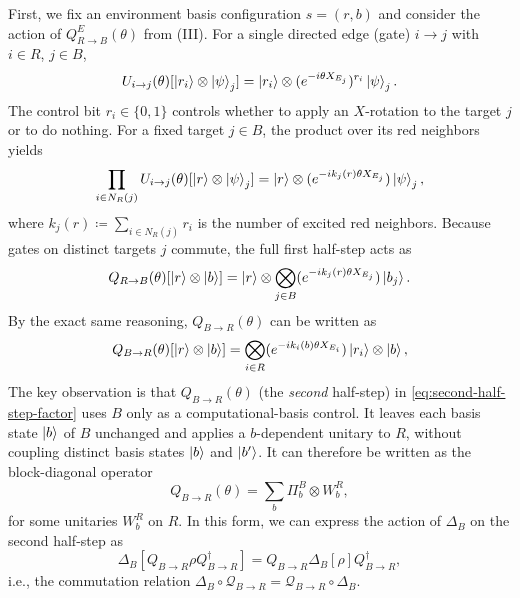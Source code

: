 \documentclass[
    aps,
    prx,
    reprint,
    superscriptaddress,
    longbibliography,
    nofootinbib,
    floatfix,
]{revtex4-2}
\begin{document}
First, we fix an environment basis configuration \(s = (r,b)\) and consider the action of \(Q_{R\to B}^E(\theta)\) from (III). For a single directed edge (gate) \(i \to j\) with \(i \in R\), \(j \in B\),
\begin{equation}\label{eq:single-i-single-j}
    U_{i\to j}(\theta)[\ket{r_i} \otimes \ket{\psi}_j] = \ket{r_i} \otimes (e^{-i\theta X_{E_j}})^{r_i} \ket{\psi}_j.
\end{equation}
The control bit \(r_i \in \{0,1\}\) controls whether to apply an \(X\)-rotation to the target \(j\) or to do nothing. For a fixed target \(j \in B\), the product over its red neighbors yields
\begin{equation}\label{eq:single-j}
    \prod_{i \in N_R(j)} U_{i\to j}(\theta)[\ket{r} \otimes \ket{\psi}_j] = \ket{r} \otimes (e^{-ik_j(r)\theta X_{E_j}}) \ket{\psi}_j,
\end{equation}
where \(k_j(r) \coloneq \sum_{i \in N_R(j)} r_i\) is the number of excited red neighbors. Because gates on distinct targets \(j\) commute, the full first half-step acts as
\begin{equation}\label{eq:first-half-step-factor}
    Q_{R\to B}(\theta)[\ket{r} \otimes \ket{b}] = \ket{r} \otimes \bigotimes_{j \in B} (e^{-ik_j(r)\theta X_{E_j}}) \ket{b_j}.
\end{equation}
By the exact same reasoning, \(Q_{B\to R}(\theta)\) can be written as
\begin{equation}\label{eq:second-half-step-factor}
    Q_{B\to R}(\theta)[\ket{r} \otimes \ket{b}] = \bigotimes_{i \in R} (e^{-ik_i(b)\theta X_{E_i}}) \ket{r_i} \otimes \ket{b},
\end{equation}
The key observation is that \(Q_{B\to R}(\theta)\) (the \emph{second} half-step) in \cref{eq:second-half-step-factor} uses \(B\) only as a computational-basis control. It leaves each basis state \(\ket{b}\) of \(B\) unchanged and applies a \(b\)-dependent unitary to \(R\), without coupling distinct basis states \(\ket{b}\) and \(\ket{b'}\). It can therefore be written as the block-diagonal operator
\begin{equation}
    Q_{B\to R}(\theta) = \sum_b \Pi_b^B \otimes W^R_b,
\end{equation}
for some unitaries \(W_b^R\) on \(R\). In this form, we can express the action of \(\Delta_B\) on the second half-step as
\begin{equation}
    \Delta_B[Q_{B \to R} \rho Q_{B \to R}^\dagger] = Q_{B \to R} \Delta_B[\rho] Q_{B \to R}^\dagger,
\end{equation}
i.e., the commutation relation \(\Delta_B \circ \mathcal{Q}_{B \to R} = \mathcal{Q}_{B \to R} \circ \Delta_B\). 
\end{document}
